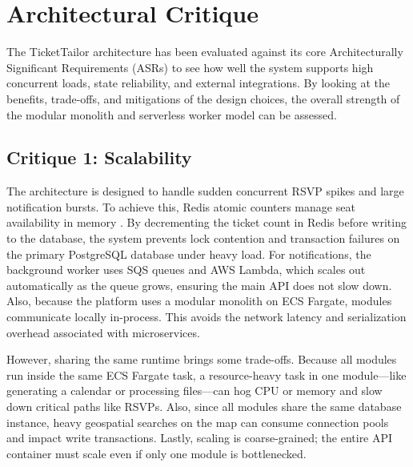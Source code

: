 \section{Architectural Critique}
\label{sec:critique}

The TicketTailor architecture has been evaluated against its core Architecturally Significant Requirements (ASRs) to see how well the system supports high concurrent loads, state reliability, and external integrations. By looking at the benefits, trade-offs, and mitigations of the design choices, the overall strength of the modular monolith and serverless worker model can be assessed.

\subsection{Critique 1: Scalability}
The architecture is designed to handle sudden concurrent RSVP spikes and large notification bursts. To achieve this, Redis atomic counters manage seat availability in memory \cite{redis_race_condition}. By decrementing the ticket count in Redis before writing to the database, the system prevents lock contention and transaction failures on the primary PostgreSQL database under heavy load. For notifications, the background worker uses SQS queues and AWS Lambda, which scales out automatically as the queue grows, ensuring the main API does not slow down. Also, because the platform uses a modular monolith on ECS Fargate, modules communicate locally in-process. This avoids the network latency and serialization overhead associated with microservices.

However, sharing the same runtime brings some trade-offs. Because all modules run inside the same ECS Fargate task, a resource-heavy task in one module—like generating a calendar or processing files—can hog CPU or memory and slow down critical paths like RSVPs. Also, since all modules share the same database instance, heavy geospatial searches on the map can consume connection pools and impact write transactions. Lastly, scaling is coarse-grained; the entire API container must scale even if only one module is bottlenecked.

